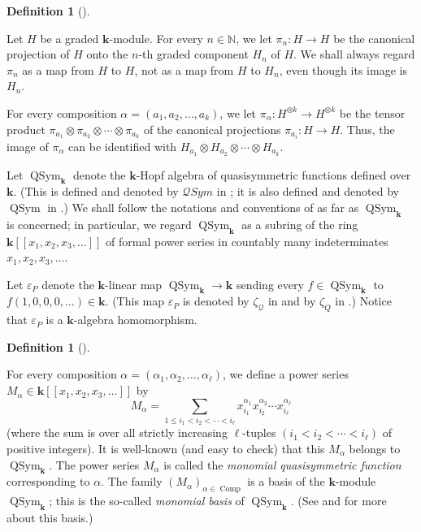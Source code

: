 \documentclass[numbers=enddot,12pt,final,onecolumn,notitlepage,abstracton]{scrartcl}%
\theoremstyle{definition}
\newtheorem{defi}[theo]{Definition}
\newenvironment{definition}[1][]
{\begin{defi}[#1]\begin{leftbar}}
{\end{leftbar}\end{defi}}
\let\sumnonlimits\sum
\renewcommand{\sum}{\sumnonlimits\limits}
\begin{document}
\begin{definition}
\label{def.pialpha}Let $H$ be a graded $\mathbf{k}$-module. For every
$n\in\mathbb{N}$, we let $\pi_{n}:H\rightarrow H$ be the canonical projection
of $H$ onto the $n$-th graded component $H_{n}$ of $H$. We shall always regard
$\pi_{n}$ as a map from $H$ to $H$, not as a map from $H$ to $H_{n}$, even
though its image is $H_{n}$.

For every composition $\alpha=\left(  a_{1},a_{2},\ldots,a_{k}\right)  $, we
let $\pi_{\alpha}:H^{\otimes k}\rightarrow H^{\otimes k}$ be the tensor
product $\pi_{a_{1}}\otimes\pi_{a_{2}}\otimes\cdots\otimes\pi_{a_{k}}$ of the
canonical projections $\pi_{a_{i}}:H\rightarrow H$. Thus, the image of
$\pi_{\alpha}$ can be identified with $H_{a_{1}}\otimes H_{a_{2}}\otimes
\cdots\otimes H_{a_{k}}$.
\end{definition}

Let $\operatorname*{QSym}\nolimits_{\mathbf{k}}$ denote the $\mathbf{k}$-Hopf
algebra of quasisymmetric functions defined over $\mathbf{k}$. (This is
defined and denoted by $\mathcal{Q}Sym$ in \cite[\S 3]{ABS}; it is also
defined and denoted by $\operatorname*{QSym}$ in \cite[Chapter 5]{Reiner}.) We
shall follow the notations and conventions of \cite[\S 5.1]{Reiner} as far as
$\operatorname*{QSym}\nolimits_{\mathbf{k}}$ is concerned; in particular, we
regard $\operatorname*{QSym}\nolimits_{\mathbf{k}}$ as a subring of the ring
$\mathbf{k}\left[  \left[  x_{1},x_{2},x_{3},\ldots\right]  \right]  $ of
formal power series in countably many indeterminates $x_{1},x_{2},x_{3}%
,\ldots$.

Let $\varepsilon_{P}$ denote the $\mathbf{k}$-linear map $\operatorname*{QSym}%
\nolimits_{\mathbf{k}}\rightarrow\mathbf{k}$ sending every $f\in
\operatorname*{QSym}\nolimits_{\mathbf{k}}$ to $f\left(  1,0,0,0,\ldots
\right)  \in\mathbf{k}$. (This map $\varepsilon_{P}$ is denoted by
$\zeta_{\mathcal{Q}}$ in \cite[\S 4]{ABS} and by $\zeta_{Q}$ in \cite[Example
7.1.2]{Reiner}.) Notice that $\varepsilon_{P}$ is a $\mathbf{k}$-algebra homomorphism.

\begin{definition}
\label{def.Malpha}For every composition $\alpha=\left(  \alpha_{1},\alpha
_{2},\ldots,\alpha_{\ell}\right)  $, we define a power series $M_{\alpha}%
\in\mathbf{k}\left[  \left[  x_{1},x_{2},x_{3},\ldots\right]  \right]  $ by%
\[
M_{\alpha}=\sum_{1\leq i_{1}<i_{2}<\cdots<i_{\ell}}x_{i_{1}}^{\alpha_{1}%
}x_{i_{2}}^{\alpha_{2}}\cdots x_{i_{\ell}}^{\alpha_{\ell}}%
\]
(where the sum is over all strictly increasing $\ell$-tuples $\left(
i_{1}<i_{2}<\cdots<i_{\ell}\right)  $ of positive integers). It is well-known
(and easy to check) that this $M_{\alpha}$ belongs to $\operatorname*{QSym}%
\nolimits_{\mathbf{k}}$. The power series $M_{\alpha}$ is called the
\textit{monomial quasisymmetric function} corresponding to $\alpha$. The
family $\left(  M_{\alpha}\right)  _{\alpha\in\operatorname*{Comp}}$ is a
basis of the $\mathbf{k}$-module $\operatorname*{QSym}\nolimits_{\mathbf{k}}$;
this is the so-called \textit{monomial basis} of $\operatorname*{QSym}%
\nolimits_{\mathbf{k}}$. (See \cite[\S 3]{ABS} and \cite[\S 5.1]{Reiner} for
more about this basis.)
\end{definition}
\end{document}
